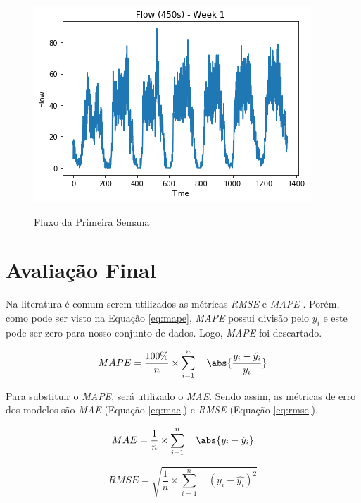 \begin{figure}[H]
    \centering
    \includegraphics[scale=1]{monography/img/flows/flow_450_week_01.png}
    \label{figure:flow_discution}
    \caption[Fluxo da Primeira Semana]{Fluxo da Primeira Semana}
\end{figure}

\section{Avaliação Final}

Na literatura é comum serem utilizados as métricas \textit{\acrfull{RMSE}} e \textit{\acrfull{MAPE}} \cite{lana_2018}. Porém, como pode ser visto na Equação \ref{eq:mape}, \textit{\acrshort{MAPE}} possui divisão pelo \({y_i}\) e este pode ser zero para nosso conjunto de dados. Logo, \textit{\acrshort{MAPE}} foi descartado. 

\begin{equation}
\label{eq:mape}
MAPE = \frac{100\%}{n} \times \sum_{i=1}^{n} \quad \abs{\frac{y_i - \hat{y_i}}{y_i}}
\end{equation}

Para substituir o \textit{\acrshort{MAPE}}, será utilizado o \textit{\acrfull{MAE}}. Sendo assim, as métricas de erro dos modelos são \textit{\acrshort{MAE}} (Equação \ref{eq:mae}) e \textit{\acrshort{RMSE}} (Equação \ref{eq:rmse}).

\begin{equation}
\label{eq:mae}
MAE = \frac{1}{n} \times \sum_{i=1}^{n} \quad \abs{y_i - \hat{y_i}}
\end{equation}

\begin{equation}
\label{eq:rmse}
RMSE = \sqrt{ \frac{1}{n} \times \sum_{i=1}^{n} \quad (y_i - \hat{y_i}) ^ 2}
\end{equation}

